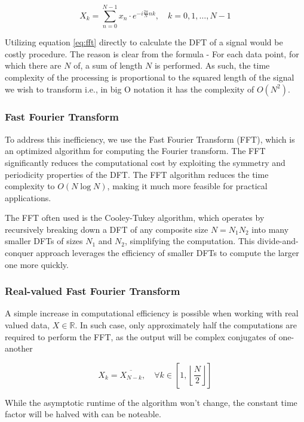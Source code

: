 \begin{equation}
    X_k = \sum_{n=0}^{N-1} x_n \cdot e^{-i \frac{2\pi}{N} nk}, \quad k = 0, 1, \ldots, N-1
    \label{eq:fft}
\end{equation}

Utilizing equation \ref{eq:fft} directly to calculate the DFT of a signal would be costly procedure. The reason is clear from the formula - For each data point, for which there are $N$ of, a sum of length $N$ is performed. As such, the time complexity of the processing is proportional to the squared length of the signal we wish to transform i.e., in big O notation it has the complexity of $O(N^2)$.

\subsubsection{Fast Fourier Transform}

To address this inefficiency, we use the Fast Fourier Transform (FFT), which is an optimized algorithm for computing the Fourier transform. The FFT significantly reduces the computational cost by exploiting the symmetry and periodicity properties of the DFT. The FFT algorithm reduces the time complexity to $O(N \log N)$, making it much more feasible for practical applications.

The FFT often used is the Cooley-Tukey algorithm, which operates by recursively breaking down a DFT of any composite size $N = N_1N_2$ into many smaller DFTs of sizes $N_1$ and $N_2$, simplifying the computation. This divide-and-conquer approach leverages the efficiency of smaller DFTs to compute the larger one more quickly.

\subsubsection{Real-valued Fast Fourier Transform}

A simple increase in computational efficiency is possible when working with real valued data, $X \in \mathbb{R}$. In such case, only approximately half the computations are required to perform the FFT, as the output will be complex conjugates of one-another

\begin{equation*}
    X_k = \overline{X_{N-k}}, \quad \forall k \in \left[1, \left\lfloor\frac{N}{2}\right\rfloor\right]
\end{equation*}

While the asymptotic runtime of the algorithm won't change, the constant time factor will be halved with can be noteable.

